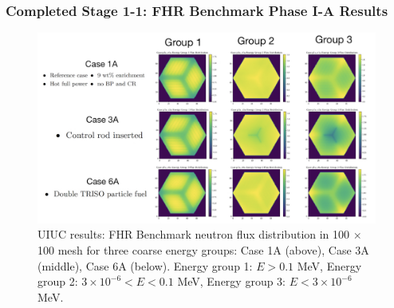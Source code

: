 \begin{frame}
    \frametitle{Completed Stage 1-1: FHR Benchmark Phase I-A Results}
    \begin{figure}[]
        \centering
        \includegraphics[width=0.9\linewidth]{figures/phase1a-e.png} 
        \vspace{-0.2cm}
        \caption{UIUC results: FHR Benchmark neutron flux 
        distribution in 100 $\times$ 100 mesh for three coarse energy groups: Case 
        1A (above), Case 3A (middle), Case 6A (below). Energy group 1: $E > 0.1$ MeV, 
        Energy group 2: $3 \times 10^{-6} < E < 0.1$ MeV, Energy group 3: $E < 3 \times 10^{-6}$ MeV. }
    \end{figure}
\end{frame}